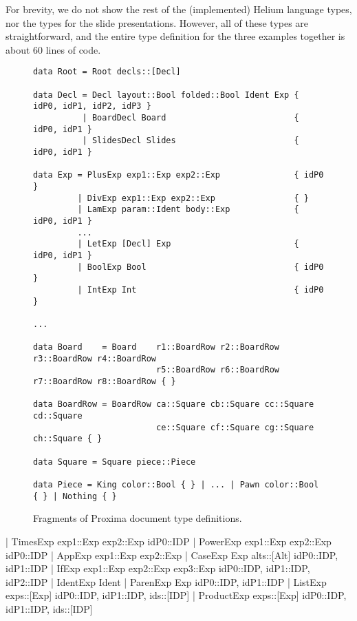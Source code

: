 For brevity, we do not show the rest of the (implemented) Helium language types, nor the types for the slide presentations. However, all of these types are straightforward, and the entire type definition for the three examples together is about 60 lines of code.


\begin{figure}[t]
\begin{small}
\begin{center}
\begin{footnotesize}
\begin{verbatim}
data Root = Root decls::[Decl]

data Decl = Decl layout::Bool folded::Bool Ident Exp { idP0, idP1, idP2, idP3 }
          | BoardDecl Board                          { idP0, idP1 }
          | SlidesDecl Slides                        { idP0, idP1 }

data Exp = PlusExp exp1::Exp exp2::Exp               { idP0 }
         | DivExp exp1::Exp exp2::Exp                { }
         | LamExp param::Ident body::Exp             { idP0, idP1 }
         ...
         | LetExp [Decl] Exp                         { idP0, idP1 }
         | BoolExp Bool                              { idP0 }
         | IntExp Int                                { idP0 }

...

data Board    = Board    r1::BoardRow r2::BoardRow r3::BoardRow r4::BoardRow
                         r5::BoardRow r6::BoardRow r7::BoardRow r8::BoardRow { }

data BoardRow = BoardRow ca::Square cb::Square cc::Square cd::Square
                         ce::Square cf::Square cg::Square ch::Square { }

data Square = Square piece::Piece

data Piece = King color::Bool { } | ... | Pawn color::Bool { } | Nothing { }
\end{verbatim}
\end{footnotesize}
\caption{Fragments of Proxima document type definitions.}\label{docTypeExample} 
\end{center}
\end{small}
\end{figure}

\bc
         | TimesExp  exp1::Exp exp2::Exp                     { idP0::IDP }
         | PowerExp exp1::Exp exp2::Exp                      { idP0::IDP }
         | AppExp exp1::Exp exp2::Exp                        { }
         | CaseExp Exp alts::[Alt]                          { idP0::IDP, idP1::IDP }
         | IfExp exp1::Exp exp2::Exp exp3::Exp                { idP0::IDP, idP1::IDP, idP2::IDP }
         | IdentExp Ident                                  { }
         | ParenExp Exp                                    { idP0::IDP, idP1::IDP }
         | ListExp exps::[Exp]                              { idP0::IDP, idP1::IDP, ids::[IDP] }
         | ProductExp exps::[Exp]                           { idP0::IDP, idP1::IDP, ids::[IDP] }

